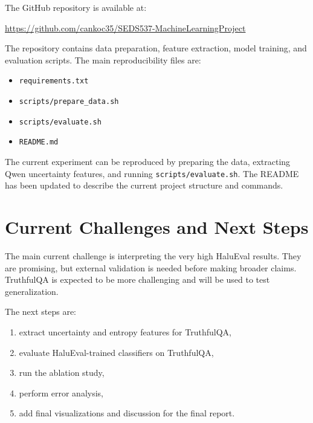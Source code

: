 \documentclass[11pt]{article}
\begin{document}
The GitHub repository is available at:

\begin{center}
\url{https://github.com/cankoc35/SEDS537-MachineLearningProject}
\end{center}

The repository contains data preparation, feature extraction, model training, and evaluation scripts. The main reproducibility files are:

\begin{itemize}
    \item \texttt{requirements.txt}
    \item \texttt{scripts/prepare\_data.sh}
    \item \texttt{scripts/evaluate.sh}
    \item \texttt{README.md}
\end{itemize}

The current experiment can be reproduced by preparing the data, extracting Qwen uncertainty features, and running \texttt{scripts/evaluate.sh}. The README has been updated to describe the current project structure and commands.

\section{Current Challenges and Next Steps}

The main current challenge is interpreting the very high HaluEval results. They are promising, but external validation is needed before making broader claims. TruthfulQA is expected to be more challenging and will be used to test generalization.

The next steps are:

\begin{enumerate}
    \item extract uncertainty and entropy features for TruthfulQA,
    \item evaluate HaluEval-trained classifiers on TruthfulQA,
    \item run the ablation study,
    \item perform error analysis,
    \item add final visualizations and discussion for the final report.
\end{enumerate}
\end{document}
